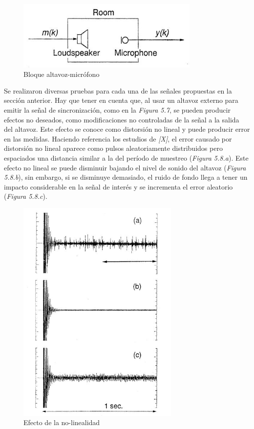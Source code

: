 \documentclass[a4paper,11pt]{book}
\begin{document}
\begin{figure}[hbtp]
\centering
\includegraphics[width = 9cm]{FIGURAS/altavoz-micro.JPG}
\caption{Bloque altavoz-micrófono}
\end{figure}


Se realizaron diversas pruebas para cada una de las señales propuestas en la sección anterior. Hay que tener en cuenta que, al usar un altavoz externo para emitir la señal de sincronización, como en la \textit{Figura 5.7}, se pueden producir efectos no deseados, como modificaciones no controladas de la señal a la salida del altavoz. Este efecto se conoce como distorsión no lineal y puede producir error en las medidas. Haciendo referencia los estudios de \textit{[X]}, el error causado por distorsión no lineal aparece como pulsos aleatoriamente distribuidos pero espaciados una distancia similar a la del período de muestreo (\textit{Figura 5.8.a}). Este efecto no lineal se puede disminuir bajando el nivel de sonido del altavoz (\textit{Figura 5.8.b}), sin embargo, si se disminuye demasiado, el ruido de fondo llega a tener un impacto considerable en la señal de interés y se incrementa el error aleatorio (\textit{Figura 5.8.c}).

\begin{figure}[hbtp]
\centering
\includegraphics[width = 8cm]{FIGURAS/nonlinear.JPG}
\caption{Efecto de la no-linealidad}
\end{figure}
\end{document}
